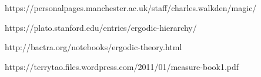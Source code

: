 \documentclass{article}
\begin{document}
\begin{thebibliography}{}
\bibitem{}
https://personalpages.manchester.ac.uk/staff/charles.walkden/magic/

\bibitem{}
https://plato.stanford.edu/entries/ergodic-hierarchy/

\bibitem{}
http://bactra.org/notebooks/ergodic-theory.html

\bibitem{}
https://terrytao.files.wordpress.com/2011/01/measure-book1.pdf

\end{thebibliography}
\end{document}
